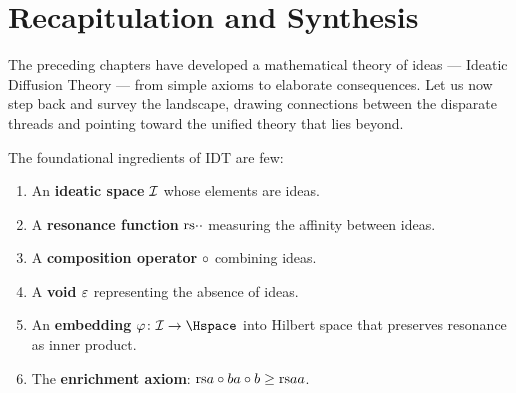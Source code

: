 \begin{center}
\end{center}


\section{Recapitulation and Synthesis}

The preceding chapters have developed a mathematical theory of ideas ---
Ideatic Diffusion Theory --- from simple axioms to elaborate consequences.
Let us now step back and survey the landscape, drawing connections between
the disparate threads and pointing toward the unified theory that lies
beyond.

The foundational ingredients of IDT are few:
\begin{enumerate}
\item An \textbf{ideatic space} $\mathcal{I}$ whose elements are ideas.
\item A \textbf{resonance function} $\mathrm{rs}{\cdot}{\cdot}$ measuring the
  affinity between ideas.
\item A \textbf{composition operator} $\circ$ combining ideas.
\item A \textbf{void} $\varepsilon$ representing the absence of ideas.
\item An \textbf{embedding} $\varphi\colon \IS \to \Hspace$ into Hilbert
  space that preserves resonance as inner product.
\item The \textbf{enrichment axiom}: $\mathrm{rs}{a \circ b}{a \circ b} \geq
  \mathrm{rs}{a}{a}$.
\end{enumerate}

